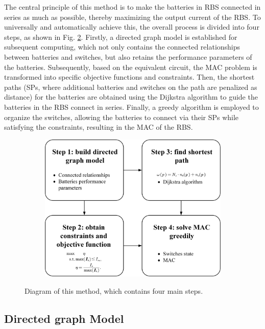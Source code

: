 \documentclass{article}
\begin{document}
The central principle of this method is to make the batteries in RBS connected in series as much as possible, thereby maximizing the output current of the RBS.
To universally and automatically achieve this, the overall process is divided into four steps, as shown in Fig. \ref{fig:main}.
Firstly, a directed graph model is established for subsequent computing, which not only contains the connected relationships between batteries and switches, but also retains the performance parameters of the batteries.
Subsequently, based on the equivalent circuit, the MAC problem is transformed into specific objective functions and constraints.
Then, the shortest paths (SPs, where additional batteries and switches on the path are penalized as distance) for the batteries are obtained using the Dijkstra algorithm to guide the batteries in the RBS connect in series.
Finally, a greedy algorithm is employed to organize the switches, allowing the batteries to connect via their SPs while satisfying the constraints, resulting in the MAC of the RBS.

\begin{figure}[htbp]
    \centering
    \begin{subfigure}[b]{0.8\textwidth}
        \includegraphics[width=\textwidth]{../attachments/main.png}
        \caption{}
        \label{fig:main}
    \end{subfigure}
    \caption{ 
        Diagram of this method, which contains four main steps.
    }
\end{figure}

\subsection{Directed graph Model}
\end{document}
